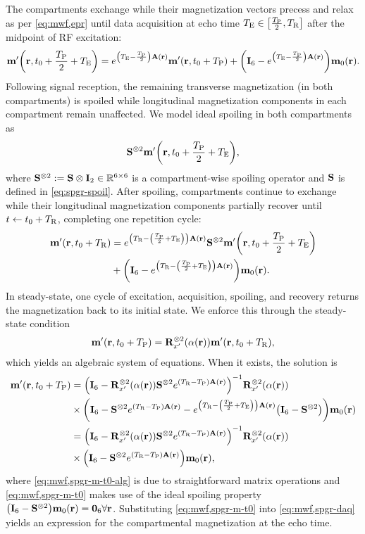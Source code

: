 The compartments exchange
while their magnetization vectors precess and relax
as per \eqref{eq:mwf,epr}
until data acquisition
at echo time $\TE \in \brac{\frac{\TP}{2},\TR}$
after the midpoint of RF excitation:
\begin{align}
	\bmmp\paren{\bmr,t_0+\frac{\TP}{2}+\TE} =
		e^{\paren{\TE-\frac{\TP}{2}}\bmA\pr} \bmmp\paren{\bmr,t_0+\TP} 
		+ \paren{\eye{6} - e^{\paren{\TE-\frac{\TP}{2}}\bmA\pr}} \bmmzero\pr.
	\label{eq:mwf,spgr-daq}
\end{align}
Following signal reception,
the remaining transverse magnetization
(in both compartments) 
is spoiled 
while longitudinal magnetization components
in each compartment
remain unaffected.
We model ideal spoiling 
in both compartments as 
\begin{align}
	\bmSsix \bmmp\paren{\bmr,t_0+\frac{\TP}{2}+\TE},
	\label{eq:mwf,spgr-spoil}
\end{align}
where $\mathbf{S}^{\otimes2} := \mathbf{S} \otimes \mathbf{I}_{2} \in \mathbb{R}^{6 \times 6}$
is a compartment-wise spoiling operator
and $\mathbf{S}$ is defined in \eqref{eq:spgr-spoil}.
After spoiling,
compartments continue to exchange
while their longitudinal magnetization components
partially recover
until $t \gets t_0 + T_\mathrm{R}$,
completing one repetition cycle:
\begin{align}
	\bmmp\paren{\bmr,t_0+\TR} &=
		e^{\paren{\TR-\paren{\frac{\TP}{2}+\TE}}\bmA\pr} \bmSsix 
		\bmmp\paren{\bmr,t_0+\frac{\TP}{2}+\TE} 
		\nonumber \\
		&+ \paren{\eye{6} - e^{\paren{\TR-\paren{\frac{\TP}{2}+\TE}}\bmA\pr}} \bmmzero\pr.
	\label{eq:mwf,spgr-epr}
\end{align}
In steady-state, one cycle of excitation, acquisition, spoiling, and recovery 
returns the magnetization back to its initial state.
We enforce this through the steady-state condition
\begin{align}
	\bmmp\paren{\bmr,t_0+\TP} = 
		\bmRxpsix{\flip\pr} \bmmp\paren{\bmr,t_0+\TR},
		\label{eq:mwf,spgr-ss}
\end{align}
which yields an algebraic system
of equations.
When it exists,
the solution is
\begin{align}
	\bmmp\paren{\bmr,t_0+\TP} &=
		\inv{\eye{6}-\bmRxpsix{\flip\pr} \bmSsix e^{\paren{\TR-\TP}\bmA\pr}} \bmRxpsix{\flip\pr}
		\label{eq:mwf,spgr-m-t0-alg} \\
	&\times \paren{\eye{6}-\bmSsix e^{\paren{\TR-\TP}\bmA\pr} -
		e^{\paren{\TR-\paren{\frac{\TP}{2}+\TE}}\bmA\pr}\paren{\eye{6}-\bmSsix}}
		\bmmzero\pr
		\nonumber \\
	&= \inv{\eye{6}-\bmRxpsix{\flip\pr} \bmSsix e^{\paren{\TR-\TP}\bmA\pr}} \bmRxpsix{\flip\pr}
		\label{eq:mwf,spgr-m-t0} \\
	&\times \paren{\eye{6}-\bmSsix e^{\paren{\TR-\TP}\bmA\pr}} \bmmzero\pr,
		\nonumber 
\end{align}
where \eqref{eq:mwf,spgr-m-t0-alg} is due
to straightforward matrix operations
and \eqref{eq:mwf,spgr-m-t0} makes use 
of the ideal spoiling property
$\paren{\eye{6}-\bmSsix}\bmmzero\pr = \zeros{6}\xspace \forall\bmr$.
Substituting \eqref{eq:mwf,spgr-m-t0}
into \eqref{eq:mwf,spgr-daq}
yields an expression
for the compartmental magnetization 
at the echo time.

